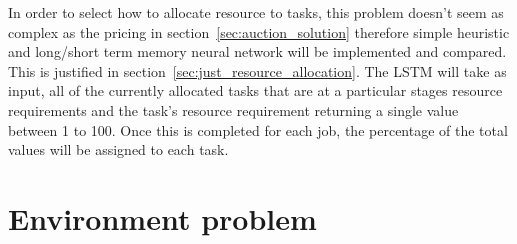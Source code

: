 In order to select how to allocate resource to tasks, this problem doesn't seem as complex as the pricing in
section~\ref{sec:auction_solution} therefore simple heuristic and long/short term memory neural network will be
implemented and compared. This is justified in section~\ref{sec:just_resource_allocation}. The LSTM will take as input, all of
the currently allocated tasks that are at a particular stages resource requirements and the task's resource requirement
returning a single value between 1 to 100. Once this is completed for each job, the percentage of the total values will
be assigned to each task.

\section{Environment problem}\label{sec:markov-decision-process-description}

